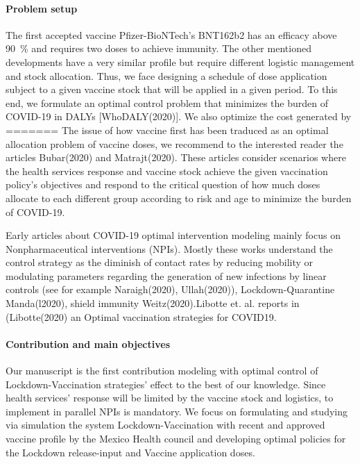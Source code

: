 \paragraph{Problem setup}
        The first accepted vaccine \textemdash Pfizer-BioNTech's BNT162b2
    \textemdash has an efficacy above \SI{90}{\percent}  and requires
    two doses to achieve immunity. The other mentioned developments have a very
    similar profile but require different logistic management and stock
    allocation.  Thus, we face designing a schedule of dose application subject
    to a given vaccine stock that will be applied in a given period. To this
    end, we formulate an optimal control problem that minimizes the burden of
    COVID-19 in DALYs [WhoDALY(2020)]. We also optimize the cost generated by
=======
        The issue of how vaccine first has been traduced as an optimal 
    allocation problem of vaccine doses, we recommend to the interested reader 
    the articles Bubar(2020) and  Matrajt(2020).  These articles consider 
    scenarios where the health services response and vaccine stock achieve the 
    given vaccination policy's objectives and respond to the critical question 
    of how much doses allocate to each different group according to risk and 
    age to minimize the burden of COVID-19.
    
        Early articles about COVID-19 optimal intervention modeling mainly 
    focus on Nonpharmaceutical interventions (NPIs). Mostly these works 
    understand the control strategy as the diminish of contact rates by 
    reducing mobility or modulating parameters regarding the generation of new 
    infections by linear controls (see for example Naraigh(2020),  
    Ullah(2020)), Lockdown-Quarantine Manda(l2020),  shield immunity 
    Weitz(2020).Libotte et. al. reports in (Libotte(2020) an Optimal vaccination 
    strategies for COVID19.
\paragraph{Contribution and main objectives}
        Our manuscript is the first contribution modeling with optimal control 
    of Lockdown-Vaccination strategies' effect to the best of our knowledge. 
    Since health services' response will be limited by the vaccine stock
    and logistics, to implement in parallel NPIs is mandatory. We focus on 
    formulating and studying via simulation the system Lockdown-Vaccination 
    with recent and approved vaccine profile by the  Mexico Health council and 
    developing optimal policies for the Lockdown release-input and Vaccine 
    application doses.
